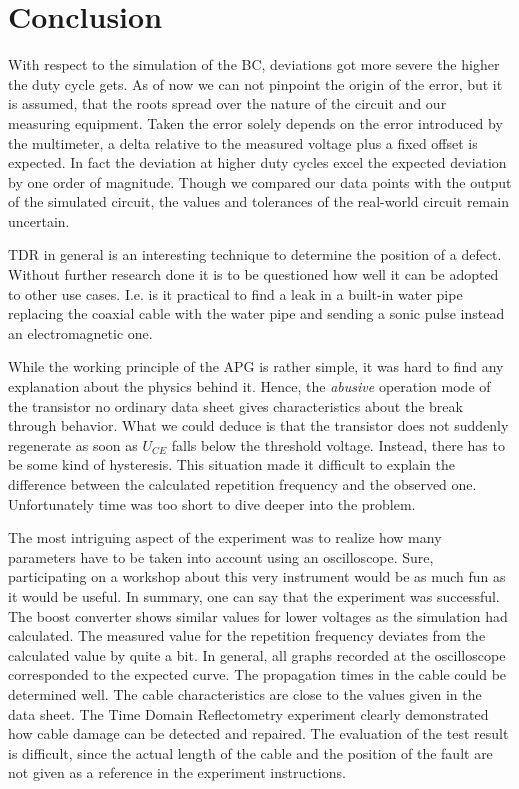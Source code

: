 \chapter{Conclusion}
%
With respect to the simulation of the BC, deviations got more severe the higher the duty cycle gets. As of now we can not
pinpoint the origin of the error, but it is assumed, that the roots spread over the nature of the circuit and our measuring equipment.
Taken the error solely depends on the error introduced by the multimeter, a delta relative to the measured voltage plus a
fixed offset is expected. In fact the deviation at higher duty cycles excel the expected deviation by one order of magnitude.
Though we compared our data points with the output of the simulated circuit, the values and tolerances of the real-world
circuit remain uncertain.

TDR in general is an interesting technique to determine the position of a defect. Without further research done it
is to be questioned how well it can be adopted to other use cases. I.e. is it practical to find a leak in a built-in water
pipe replacing the coaxial cable with the water pipe and sending a sonic pulse instead an electromagnetic one.

While the working principle of the APG is rather simple, it was hard to find any explanation about the physics behind it.
Hence, the \textit{abusive} operation mode of the transistor no ordinary data sheet gives characteristics about the break
through behavior. What we could deduce is that the transistor does not suddenly regenerate as soon as \( U_{CE} \)
falls below the threshold voltage. Instead, there has to be some kind of hysteresis. This situation made it difficult to
explain the difference between the calculated repetition frequency and the observed one. Unfortunately time was too short
to dive deeper into the problem.

The most intriguing aspect of the experiment was to realize how many parameters have to be taken into account using an
oscilloscope. Sure, participating on a workshop about this very instrument would be as much fun as it would be useful.
\medskip
In summary, one can say that the experiment was successful. The boost converter shows similar values for lower voltages
as the simulation had calculated.
The measured value for the repetition frequency deviates from the calculated value by
quite a bit. In general, all graphs recorded at the oscilloscope corresponded to the expected curve. The propagation
times in the cable could be determined well. The cable characteristics are close to the values given in the data sheet.
The Time Domain Reflectometry experiment clearly demonstrated how cable damage can be detected and repaired. The evaluation
of the test result is difficult, since the actual length of the cable and the position of the fault are not given as a
reference in the experiment instructions.